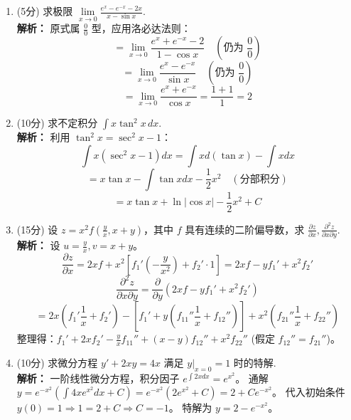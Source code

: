 \documentclass[10pt, a3paper, landscape, twocolumn]{article}
\begin{document}
\begin{enumerate}[start=17]
    \item (5分) 求极限 $\lim\limits_{x \to 0} \frac{e^x - e^{-x} - 2x}{x - \sin x}$. \\
    {\color{red} \small \textbf{解析：} 
    原式属 $\frac{0}{0}$ 型，应用洛必达法则：
    $$ = \lim_{x\to 0} \frac{e^x + e^{-x} - 2}{1 - \cos x} \quad (\text{仍为 } \frac{0}{0}) $$
    $$ = \lim_{x\to 0} \frac{e^x - e^{-x}}{\sin x} \quad (\text{仍为 } \frac{0}{0}) $$
    $$ = \lim_{x\to 0} \frac{e^x + e^{-x}}{\cos x} = \frac{1+1}{1} = 2 $$
    }
    \vspace{2cm}

    \item (10分) 求不定积分 $\int x \tan^2 x \, dx$. \\
    {\color{red} \small \textbf{解析：} 
    利用 $\tan^2 x = \sec^2 x - 1$：
    $$ \int x(\sec^2 x - 1)dx = \int x d(\tan x) - \int x dx $$
    $$ = x \tan x - \int \tan x dx - \frac{1}{2}x^2 \quad (\text{分部积分}) $$
    $$ = x \tan x + \ln|\cos x| - \frac{1}{2}x^2 + C $$
    }
    \vspace{2cm}

    \item (15分) 设 $z = x^2 f\left(\frac{y}{x}, x+y\right)$，其中 $f$ 具有连续的二阶偏导数，求 $\frac{\partial z}{\partial x}, \frac{\partial^2 z}{\partial x \partial y}$. \\
    {\color{red} \small \textbf{解析：} 
    设 $u = \frac{y}{x}, v = x+y$。
    $$ \frac{\partial z}{\partial x} = 2xf + x^2[f_1'(-\frac{y}{x^2}) + f_2' \cdot 1] = 2xf - yf_1' + x^2f_2' $$
    $$ \frac{\partial^2 z}{\partial x \partial y} = \frac{\partial}{\partial y}(2xf - yf_1' + x^2f_2') $$
    $$ = 2x(f_1'\frac{1}{x} + f_2') - [f_1' + y(f_{11}''\frac{1}{x} + f_{12}'')] + x^2(f_{21}''\frac{1}{x} + f_{22}'') $$
    整理得：$f_1' + 2xf_2' - \frac{y}{x}f_{11}'' + (x-y)f_{12}'' + x^2f_{22}''$ (假定 $f_{12}''=f_{21}''$)。
    }
    \vspace{3cm}

    \item (10分) 求微分方程 $y' + 2xy = 4x$ 满足 $y|_{x=0} = 1$ 时的特解. \\
    {\color{red} \small \textbf{解析：} 
    一阶线性微分方程，积分因子 $e^{\int 2x dx} = e^{x^2}$。
    \newline 通解 $y = e^{-x^2}(\int 4x e^{x^2} dx + C) = e^{-x^2}(2e^{x^2} + C) = 2 + Ce^{-x^2}$。
    \newline 代入初始条件 $y(0)=1 \Rightarrow 1 = 2 + C \Rightarrow C = -1$。
    \newline 特解为 $y = 2 - e^{-x^2}$。
    }
    \vspace{3cm}


\end{enumerate}
\end{document}
